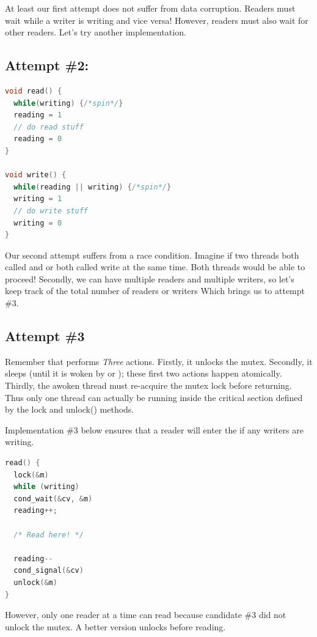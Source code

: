 At least our first attempt does not suffer from data corruption.
Readers must wait while a writer is writing and vice versa!
However, readers must also wait for other readers.
Let's try another implementation.

\subsection{Attempt \#2:}

\begin{lstlisting}[language=C]
void read() {
  while(writing) {/*spin*/}
  reading = 1
  // do read stuff
  reading = 0
}

void write() {
  while(reading || writing) {/*spin*/}
  writing = 1
  // do write stuff
  writing = 0
}
\end{lstlisting}

Our second attempt suffers from a race condition.
Imagine if two threads both called  and  or both called write at the same time.
Both threads would be able to proceed!
Secondly, we can have multiple readers and multiple writers, so let's keep track of the total number of readers or writers
Which brings us to attempt \#3.

\subsection{Attempt \#3}

Remember that  performs \emph{Three} actions.
Firstly, it unlocks the mutex.
Secondly, it sleeps (until it is woken by  or ); these first two actions happen atomically.
Thirdly, the awoken thread must re-acquire the mutex lock before returning.
Thus only one thread can actually be running inside the critical section defined by the lock and unlock() methods.

Implementation \#3 below ensures that a reader will enter the  if any writers are writing.

\begin{lstlisting}[language=C]
read() {
  lock(&m)
  while (writing)
  cond_wait(&cv, &m)
  reading++;

  /* Read here! */

  reading--
  cond_signal(&cv)
  unlock(&m)
}
\end{lstlisting}

However, only one reader at a time can read because candidate \#3 did not unlock the mutex.
A better version unlocks before reading.

